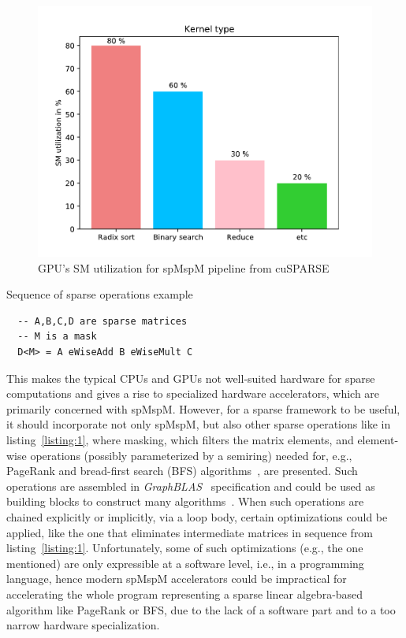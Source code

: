 \documentclass[10pt,conference]{IEEEtran}
\begin{document}
\begin{figure}[t]
  \centering
  \includegraphics[width=\linewidth]{figs/SM_performance.pdf}
  \caption[Caption for LOF]{GPU's SM utilization for spMspM pipeline from cuSPARSE\footnotemark}
  \label{fig:sm_util}
\end{figure}


\begin{listing}
  \caption{Sequence of sparse operations example}
\label{listing:1}

\begin{verbatim}
  -- A,B,C,D are sparse matrices
  -- M is a mask
  D<M> = A eWiseAdd B eWiseMult C
\end{verbatim}

\end{listing}

This makes the typical CPUs and GPUs not well-suited hardware for sparse computations and gives a rise to specialized hardware accelerators, which are primarily concerned with spMspM.
However, for a sparse framework to be useful, it should incorporate not only spMspM, but also other sparse operations like in listing~\ref{listing:1}, where masking, which filters the matrix elements, and element-wise operations (possibly parameterized by a semiring) needed for, e.g., PageRank and bread-first search (BFS) algorithms~\cite{yang2020graphblast},  are presented.
Such operations are assembled in \emph{GraphBLAS}~\cite{buluc2017graphblas} specification and could be used as building blocks to construct many algorithms~\cite{compBio,Kepner_2017,GAILLA}.
When such operations are chained explicitly or implicitly, via a loop body, certain optimizations could be applied, like the one that eliminates intermediate matrices in sequence from listing~\ref{listing:1}.
Unfortunately, some of such optimizations (e.g., the one mentioned) are only expressible at a software level, i.e., in a programming language, hence modern spMspM accelerators could be impractical for accelerating the whole program representing a sparse linear algebra-based algorithm like PageRank or BFS, due to the lack of a software part and to a too narrow hardware specialization.
\end{document}
